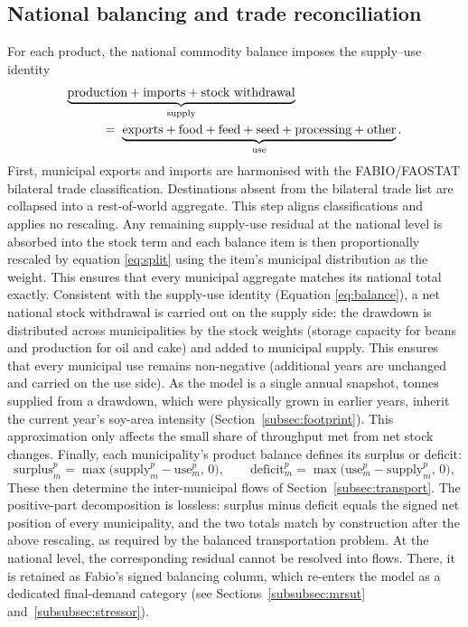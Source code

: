 \subsection{National balancing and trade reconciliation}\label{subsec:balancing}
For each product, the national commodity balance imposes the supply--use
identity
\begin{equation}\label{eq:balance}
\begin{aligned}
  \underbrace{\text{production}+\text{imports}+\text{stock withdrawal}}_{\text{supply}}
  \hspace{28mm}&\\[-1pt]
  =\;\underbrace{\text{exports}+\text{food}+\text{feed}+\text{seed}
    +\text{processing}+\text{other}}_{\text{use}}&\,.
\end{aligned}
\end{equation}
First, municipal exports and imports are harmonised with the FABIO/FAOSTAT bilateral trade classification. Destinations absent from the bilateral trade list are collapsed into a rest-of-world aggregate. This step aligns classifications and applies no rescaling. Any remaining supply-use residual at the national level is absorbed into the stock term and each balance item is then proportionally rescaled by equation \eqref{eq:split} using the item's municipal distribution as the weight. This ensures that every municipal aggregate matches its national total exactly. Consistent with the supply-use identity (Equation \eqref{eq:balance}), a net national stock withdrawal is carried out on the supply side: the drawdown is distributed across municipalities by the stock weights (storage capacity for beans and production for oil and cake) and added to municipal supply. This ensures that every municipal use remains non-negative (additional years are unchanged and carried on the use side). As the model is a single annual snapshot, tonnes supplied from a drawdown, which were physically grown in earlier years, inherit the current year's soy-area intensity
(Section~\ref{subsec:footprint}). This approximation only affects the small share of throughput met from net stock changes. Finally, each municipality's product balance defines its surplus or deficit:
\begin{equation}\label{eq:surplus}
  \text{surplus}^p_m=\max\!\big(\text{supply}^p_m-\text{use}^p_m,\,0\big),
  \qquad
  \text{deficit}^p_m=\max\!\big(\text{use}^p_m-\text{supply}^p_m,\,0\big),
\end{equation}
These then determine the inter-municipal flows of Section~\ref{subsec:transport}.
The positive-part decomposition is lossless: surplus minus deficit equals the
signed net position of every municipality, and the two totals match by
construction after the above rescaling, as required by the balanced transportation problem. At the national level, the corresponding residual cannot be resolved into flows. There, it is retained as Fabio's signed balancing column, which re-enters the model as a dedicated final-demand category (see Sections~\ref{subsubsec:mrsut} and~\ref{subsubsec:stressor}).


